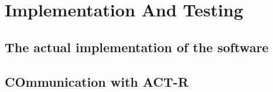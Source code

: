\chapter{Implementation And Testing}
	\section{The actual implementation of the software}
	\section{COmmunication with ACT-R}
